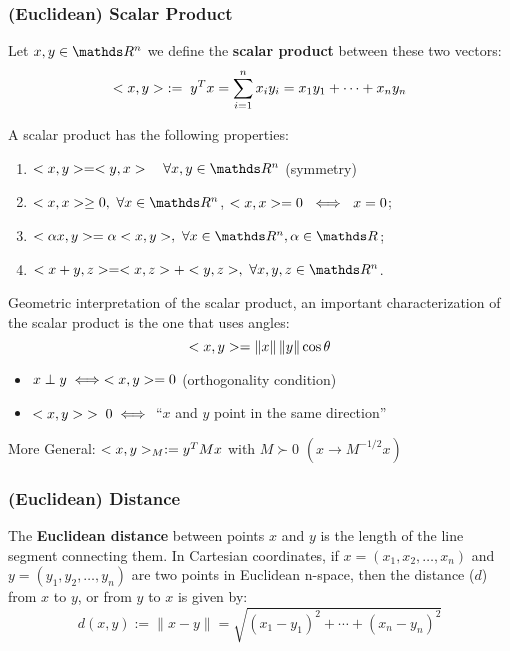 \documentclass[ComputationalMathematics.tex]{subfiles}
\begin{document}


\subsubsection{(Euclidean) Scalar Product}

\begin{definition}
  Let $x, y \in \R^n$ we define the \textbf{scalar product} between these two vectors:
  \[
<x, y> \; := \; y^T x = \sum_{i=1}^n x_i y_i = x_1 y_1 + \cdots + x_n y_n
  \]
\end{definition}

\begin{proposition}
A scalar product has the following properties:
\begin{enumerate}
  \item $\ps{x}{y} = \ps{y}{x} \quad \forall x, y \in \R^n$ (symmetry)
  \item $\ps{x}{x} \ge 0,~\forall x \in \R^n$, $<x, x>=0~\iff~x=0$;
  \item $\ps{\alpha x}{y} = \alpha \ps{x}{y},~\forall x\in\R^n, \alpha \in \R$;
  \item $\ps{x + y}{z} = \ps{x}{z} + \ps{y}{z},~\forall x,y, z \in \R^n$.
\end{enumerate}
\end{proposition}

Geometric interpretation of the scalar product, an important characterization of the scalar product is the one that uses angles:
\[
  <x, y> = \left\lVert x\right\rVert \left\lVert y\right\rVert \cos \theta
\]
\begin{itemize}
    \item $x \perp y \iff <x, y> = 0$ (orthogonality condition)
    \item $<x, y> \; >\;  0 \iff$ ``$x$ and $y$ point in the same direction''
\end{itemize}

\noindent More General: $ <x, y>_M := {y}^{T}Mx $ with $M \succ 0$  $( x \longrightarrow M^{-1/2}x)$

\subsubsection{(Euclidean) Distance}
\begin{definition}
The \textbf{Euclidean distance} between points $x$ and $y$ is the length of the line segment connecting them. In Cartesian coordinates, if $x = (x_{1}, x_{2}, \ldots, x_{n})$ and $y = (y_{1}, y_{2}, \ldots, y_{n})$ are two points in Euclidean n-space, then the distance ($d$) from $x$ to $y$, or from $y$ to $x$ is given by:
  \[
    d(x,y) := \lVert x - y \rVert = \sqrt{{(x_{1} - y_{1})}^{2} + \cdots + {(x_{n} - y_{n})}^{2}} 
  \]
  
\end{definition}
 
\end{document}
